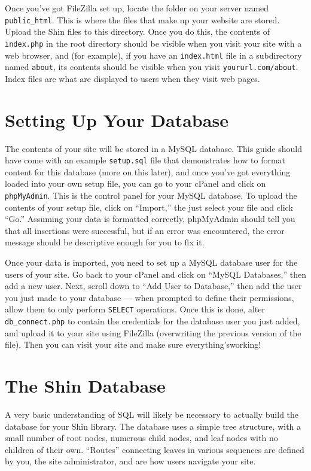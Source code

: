 \documentclass[11pt]{article} %
\begin{document}
Once you’ve got FileZilla set up, locate the folder on your server named \texttt{public\_html}. This is where the files that make up your website are stored. Upload the Shin files to this directory. Once you do this, the contents of \texttt{index.php} in the root directory should be visible when you visit your site with a web browser, and (for example), if you have an \texttt{index.html} file in a subdirectory named \texttt{about}, its contents should be visible when you visit \texttt{yoururl.com/about}. Index files are what are displayed to users when they visit web pages.

\section{Setting Up Your Database}

The contents of your site will be stored in a MySQL database. This guide should have come with an example \texttt{setup.sql} file that demonstrates how to format content for this database (more on this later), and once you’ve got everything loaded into your own setup file, you can go to your cPanel and click on \texttt{phpMyAdmin}. This is the control panel for your MySQL database. To upload the contents of your setup file, click on “Import,” the just select your file and click “Go.” Assuming your data is formatted correctly, phpMyAdmin should tell you that all insertions were successful, but if an error was encountered, the error message should be descriptive enough for you to fix it.

Once your data is imported, you need to set up a MySQL database user for the users of your site. Go back to your cPanel and click on “MySQL Databases,” then add a new user. Next, scroll down to “Add User to Database,” then add the user you just made to
your database — when prompted to define their permissions, allow them to only perform \texttt{SELECT} operations. Once this is done, alter \texttt{db\_connect.php} to contain the credentials for the database user you just added, and upload it to your site using FileZilla (overwriting the previous version of the file). Then you can visit your site and make sure everything’sworking!

\section{The Shin Database}

A very basic understanding of SQL will likely be necessary to actually build the database for your Shin library. The database uses a simple tree structure, with a small number of root nodes, numerous child nodes, and leaf nodes with no children of their own. “Routes” connecting leaves in various sequences are defined by you, the site administrator, and are how users navigate your site.
\end{document}
